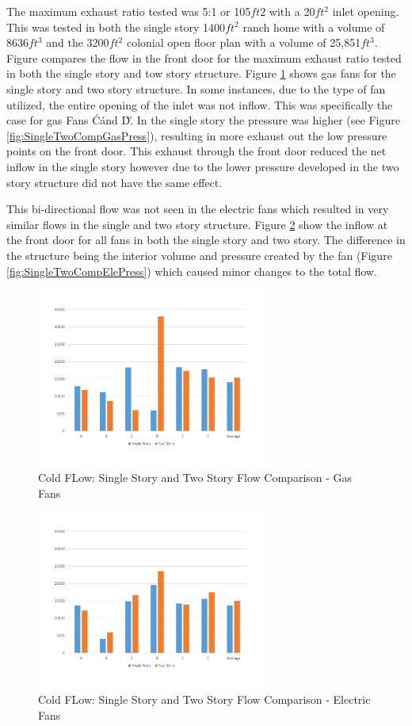 \documentclass{article}
\begin{document}
The maximum exhaust ratio tested was 5:1 or 105$ft2$ with a 20$ft^2$ inlet opening. This was tested in both the single story 1400$ft^2$ ranch home with a volume of 8636$ft^3$ and the 3200$ft^2$ colonial open floor plan with a volume of 25,851$ft^3$. Figure  compares the flow in the front door for the maximum exhaust ratio tested in both the single story and tow story structure. Figure \ref{fig:SingleTwoCompGasFlow} shows gas fans for the single story and two story structure. In some instances, due to the type of fan utilized, the entire opening of the inlet was not inflow. This was specifically the case for gas Fans \'C\' and \'D\'. In the single story the pressure was higher (see Figure \ref{fig:SingleTwoCompGasPress}), resulting in more exhaust out the low pressure points on the front door. This exhaust through the front door reduced the net inflow in the single story however due to the lower pressure developed in the two story structure did not have the same effect. 

This bi-directional flow was not seen in the electric fans which resulted in very similar flows in the single and two story structure. Figure \ref{fig:SingleTwoCompEleFlow} show the inflow at the front door for all fans in both the single story and two story. The difference in the structure being the interior volume and pressure created by the fan (Figure \ref{fig:SingleTwoCompElePress}) which caused minor changes to the total flow. 

\begin{figure}[H]
	\centering
	\includegraphics[width=3in]{0_Images/ColdFlow/Gas_Flow.pdf}
	\caption{Cold FLow: Single Story and Two Story Flow Comparison - Gas Fans}
	\label{fig:SingleTwoCompGasFlow}
\end{figure}

\begin{figure}[H]
	\centering
	\includegraphics[width=3in]{0_Images/ColdFlow/Ele_Flow.pdf}
	\caption{Cold FLow: Single Story and Two Story Flow Comparison - Electric Fans}
	\label{fig:SingleTwoCompEleFlow}
\end{figure}
\end{document}
